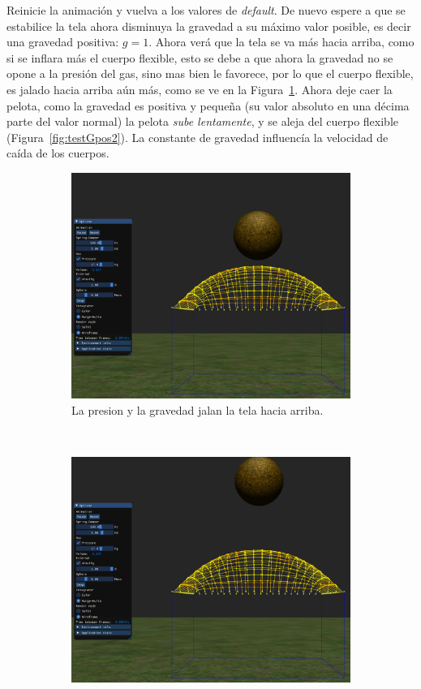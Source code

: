 Reinicie la animación y vuelva a los valores de \emph{\foreignlanguage{english}{default}}.
De nuevo espere a que se estabilice la tela ahora disminuya la gravedad a su máximo valor posible, es decir una gravedad positiva: $g=1$.
Ahora verá que la tela se va más hacia arriba, como si se inflara más el cuerpo flexible, esto se debe a que ahora la gravedad no se opone a la presión del gas, sino mas bien le favorece, por lo que el cuerpo flexible, es jalado hacia arriba aún más, como se ve en la Figura~\ref{fig:testGpos1}.
Ahora deje caer la pelota, como la gravedad es positiva y pequeña (su valor absoluto en una décima parte del valor normal) la pelota \emph{sube lentamente}, y se aleja del cuerpo flexible (Figura~\ref{fig:testGpos2}).
La constante de gravedad influencía la velocidad de caída de los cuerpos.

\begin{figure}
 \centering
  \begin{subfigure}[b]{0.45\textwidth}
    \includegraphics[width=\textwidth]{Img/04/positiveGravity1}
    \caption{La presion y la gravedad jalan la tela hacia arriba.}
    \label{fig:testGpos1}
  \end{subfigure}
~
  \begin{subfigure}[b]{0.45\textwidth}
    \includegraphics[width=\textwidth]{Img/04/positiveGravity2}

\end{subfigure}
\end{figure}
